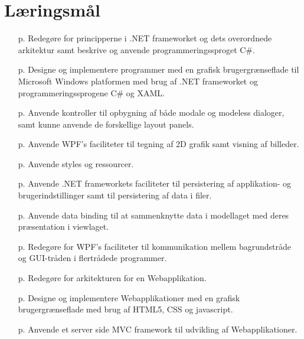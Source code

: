\section{Læringsmål}

\begin{itemize}
	\item [p.\pageref{sec:spm1}] Redegøre for principperne i .NET frameworket og dets overordnede arkitektur samt beskrive og anvende programmeringssproget C\#.
	\item [p.\pageref{sec:spm2}] Designe og implementere programmer med en grafisk brugergrænseflade til Microsoft Windows platformen med brug af .NET frameworket og programmeringssprogene C\# og XAML.
	\item [p.\pageref{sec:spm3}] Anvende kontroller til opbygning af både modale og modeless dialoger, samt kunne anvende de forskellige layout panels.
	\item [p.\pageref{sec:spm4}] Anvende WPF's faciliteter til tegning af 2D grafik samt visning af billeder.
	\item [p.\pageref{sec:spm5}] Anvende styles og ressourcer.
	\item [p.\pageref{sec:spm6}] Anvende .NET frameworkets faciliteter til persistering af applikation- og brugerindstillinger samt til persistering af data i filer.
	\item [p.\pageref{sec:spm7}] Anvende data binding til at sammenknytte data i modellaget med deres præsentation i viewlaget.
	\item [p.\pageref{sec:spm8}] Redegøre for WPF's faciliteter til kommunikation mellem bagrundstråde og GUI-tråden i flertrådede programmer.
	\item [p.\pageref{sec:spm9}] Redegøre for arkitekturen for en Webapplikation.
	\item [p.\pageref{sec:spm10}] Designe og implementere Webapplikationer med en grafisk brugergrænseflade med brug af HTML5, CSS og javascript.
	\item [p.\pageref{sec:spm11}] Anvende et server side MVC framework til udvikling af Webapplikationer.
\end{itemize}